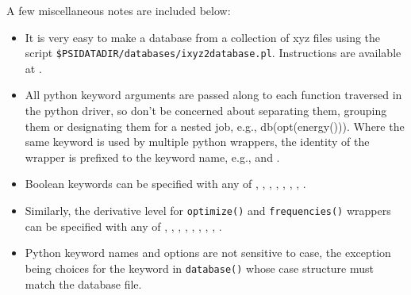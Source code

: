 A few miscellaneous notes are included below:
\begin{itemize}
\item It is very easy to make a database from a collection of xyz files using the script
\texttt{\$PSIDATADIR/databases/ixyz2database.pl}. Instructions are available at 
.
\item All python keyword arguments are passed along to each function traversed in the
python driver, so don't be concerned about separating them, grouping them or
designating them for a nested job, e.g., db(opt(energy())). Where the same keyword is
used by multiple python wrappers, the identity of the wrapper is prefixed to the keyword
name, e.g.,  and .
\item Boolean keywords can be specified with any of , 
, , , , 
, ,  .
\item Similarly, the derivative level for \texttt{optimize()} and \texttt{frequencies()} wrappers
can be specified with any of , , ,
, , ,
, , .
\item Python keyword names and options are not sensitive to case, the exception being
choices for the  keyword in \texttt{database()} whose case structure 
must match the database file.
\end{itemize}

